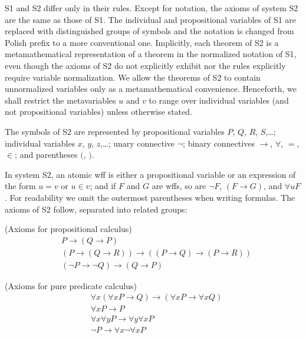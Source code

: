 \documentclass[leqno]{article}
\begin{document}
     S1 and S2 differ only in their rules.  Except for notation, the axioms of
system S2 are the same as those of S1.  The individual and propositional
variables of S1 are replaced with distinguished groups of symbols and the
notation is changed from Polish prefix to a more conventional one.
Implicitly, each theorem of S2 is a metamathematical representation of a
theorem in the normalized notation of S1, even though the axioms of S2 do not
explicitly exhibit nor the rules explicitly require variable normalization.
We allow the theorems of S2 to contain unnormalized variables only as a
metamathematical convenience.  Henceforth, we shall restrict the metavariables
$u$ and $v$ to range over individual variables (and not propositional
variables) unless otherwise stated.

     The symbols of S2 are represented by
propositional variables  $P$, $Q$, $R$, $S$,\ldots ;
individual variables  $x$, $y$, $z$,\ldots ;
unary connective  $\lnot $;
binary connectives  $\rightarrow $, $\forall $, $=$, $\in $; and
parentheses  $($, $)$.

     In system S2, an atomic wff is either a propositional variable or an
expression of the form $u=v$ or $u\in v$; and if $F$ and $G$ are wffs, so are
$\lnot F$, $(F\rightarrow G)$, and $\forall uF$.  For readability we
omit the outermost parentheses when writing formulas.  The axioms of S2
follow, separated into related groups:

\vspace{1ex}
  (Axioms for propositional calculus)
\setcounter{equation}{0}
\renewcommand{\theequation}{B\arabic{equation}}
\begin{eqnarray}
    & P\rightarrow (Q\rightarrow P) \\
    & (P\rightarrow (Q\rightarrow R))\rightarrow ((P\rightarrow
Q)\rightarrow (P\rightarrow R)) \\
    & (\lnot P\rightarrow \lnot Q)\rightarrow (Q\rightarrow P)
\end{eqnarray}

  (Axioms for pure predicate calculus)
\begin{eqnarray}
    & \forall x(\forall xP\rightarrow Q)\rightarrow (\forall
xP\rightarrow \forall xQ) \\
    & \forall xP\rightarrow P \\
    & \forall x\forall yP\rightarrow \forall y\forall xP \\
    & \lnot P\rightarrow \forall x\lnot \forall xP
\end{eqnarray}
\end{document}

